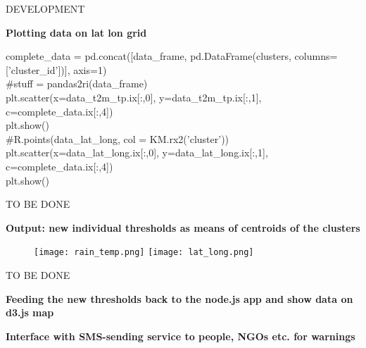 \documentclass[xcolor=x11names,compress]{beamer}
\renewcommand{\(}{\begin{columns}}
\renewcommand{\)}{\end{columns}}
\newcommand{\<}[1]{\begin{column}{#1}}
\renewcommand{\>}{\end{column}}
\begin{document}
\begin{frame}{DEVELOPMENT}
\large
\begin{block}{}
\bf Plotting data on lat lon grid
\end{block}
\begin{block}{}
  \bf 
 \scriptsize{
  \begin{texttt}{ 
complete\_data = pd.concat([data\_frame, pd.DataFrame(clusters, columns=['cluster\_id'])], axis=1)
\\
\#stuff = pandas2ri(data\_frame)
\\
plt.scatter(x=data\_t2m\_tp.ix[:,0], y=data\_t2m\_tp.ix[:,1], c=complete\_data.ix[:,4])
\\
plt.show()
\\
\#R.points(data\_lat\_long, col = KM.rx2('cluster'))
\\
plt.scatter(x=data\_lat\_long.ix[:,0], y=data\_lat\_long.ix[:,1], c=complete\_data.ix[:,4])
\\
plt.show()\\
}
\end{texttt}}
\end{block}
\end{frame}

\begin{frame}{TO BE DONE}
\large
\begin{block}{}
\bf Output: new individual thresholds as means of centroids of the clusters
\end{block}
\pause
\begin{figure}\centering
	 \texttt{[image: rain\_temp.png]}
	 \texttt{[image: lat\_long.png]}
\end{figure}


\end{frame}



\begin{frame}{TO BE DONE}
\large
\begin{block}{}
\bf Feeding the new thresholds back to the node.js app and show data on d3.js map
\end{block}
\pause
\vspace{6 mm}
\begin{block}{}
\bf Interface with SMS-sending service to people, NGOs etc. for warnings
\end{block}
\begin{block}{}
\bf 
\end{block}
\begin{block}{}
\bf 
\end{block}

\end{frame}
\end{document}
